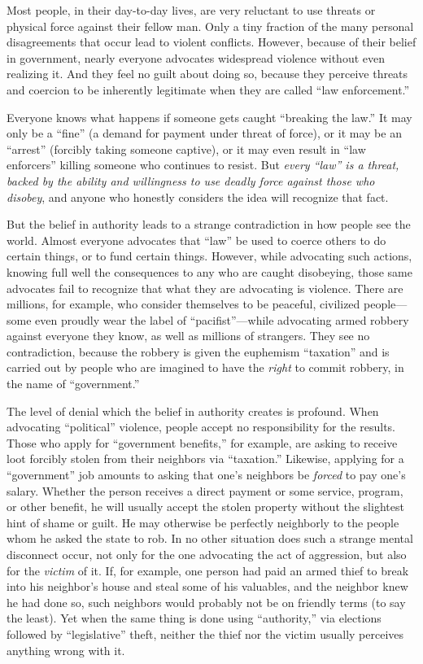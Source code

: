\documentclass{book}
\begin{document}
Most people, in their day-to-day lives, are very reluctant to use threats or physical force against their fellow man. Only a tiny fraction of the many personal disagreements that occur lead to violent conflicts. However, because of their belief in government, nearly everyone advocates widespread violence without even realizing it. And they feel no guilt about doing so, because they perceive threats and coercion to be inherently legitimate when they are called \enquote{law enforcement.}

Everyone knows what happens if someone gets caught \enquote{breaking the law.} It may only be a \enquote{fine} (a demand for payment under threat of force), or it may be an \enquote{arrest} (forcibly taking someone captive), or it may even result in \enquote{law enforcers} killing someone who continues to resist. But \emph{every \enquote{law} is a threat, backed by the ability and willingness to use deadly force against those who disobey}, and anyone who honestly considers the idea will recognize that fact.

But the belief in authority leads to a strange contradiction in how people see the world. Almost everyone advocates that \enquote{law} be used to coerce others to do certain things, or to fund certain things. However, while advocating such actions, knowing full well the consequences to any who are caught disobeying, those same advocates fail to recognize that what they are advocating is violence. There are millions, for example, who consider themselves to be peaceful, civilized people---some even proudly wear the label of \enquote{pacifist}---while advocating armed robbery against everyone they know, as well as millions of strangers. They see no contradiction, because the robbery is given the euphemism \enquote{taxation} and is carried out by people who are imagined to have the \emph{right} to commit robbery, in the name of \enquote{government.}

The level of denial which the belief in authority creates is profound. When advocating \enquote{political} violence, people accept no responsibility for the results. Those who apply for \enquote{government benefits,} for example, are asking to receive loot forcibly stolen from their neighbors via \enquote{taxation.} Likewise, applying for a \enquote{government} job amounts to asking that one's neighbors be \emph{forced} to pay one's salary. Whether the person receives a direct payment or some service, program, or other benefit, he will usually accept the stolen property without the slightest hint of shame or guilt. He may otherwise be perfectly neighborly to the people whom he asked the state to rob. In no other situation does such a strange mental disconnect occur, not only for the one advocating the act of aggression, but also for the \emph{victim} of it. If, for example, one person had paid an armed thief to break into his neighbor's house and steal some of his valuables, and the neighbor knew he had done so, such neighbors would probably not be on friendly terms (to say the least). Yet when the same thing is done using \enquote{authority,} via elections followed by \enquote{legislative} theft, neither the thief nor the victim usually perceives anything wrong with it.
\end{document}
